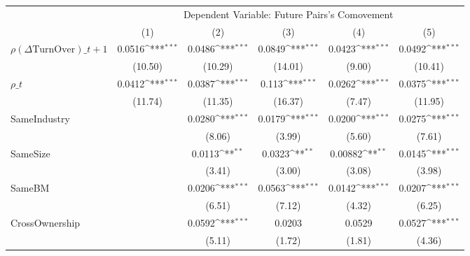 {
\def\sym#1{\ifmmode^{#1}\else\(^{#1}\)\fi}
\begin{tabular}{l*{5}{c}}
\hline\hline
                    &\multicolumn{5}{c}{Dependent Variable:  Future Pairs's Comovement}                                           \\\cmidrule(lr){2-6}
                    &\multicolumn{1}{c}{(1)}         &\multicolumn{1}{c}{(2)}         &\multicolumn{1}{c}{(3)}         &\multicolumn{1}{c}{(4)}         &\multicolumn{1}{c}{(5)}         \\
\hline
 $ {\rho(\Delta \text{TurnOver})\_{t+1}} $ &      0.0516\sym{***}&      0.0486\sym{***}&      0.0849\sym{***}&      0.0423\sym{***}&      0.0492\sym{***}\\
                    &     (10.50)         &     (10.29)         &     (14.01)         &      (9.00)         &     (10.41)         \\
[1em]
 $ {\rho\_t} $       &      0.0412\sym{***}&      0.0387\sym{***}&       0.113\sym{***}&      0.0262\sym{***}&      0.0375\sym{***}\\
                    &     (11.74)         &     (11.35)         &     (16.37)         &      (7.47)         &     (11.95)         \\
[1em]
SameIndustry        &                     &      0.0280\sym{***}&      0.0179\sym{***}&      0.0200\sym{***}&      0.0275\sym{***}\\
                    &                     &      (8.06)         &      (3.99)         &      (5.60)         &      (7.61)         \\
[1em]
SameSize            &                     &      0.0113\sym{**} &      0.0323\sym{**} &     0.00882\sym{**} &      0.0145\sym{***}\\
                    &                     &      (3.41)         &      (3.00)         &      (3.08)         &      (3.98)         \\
[1em]
SameBM              &                     &      0.0206\sym{***}&      0.0563\sym{***}&      0.0142\sym{***}&      0.0207\sym{***}\\
                    &                     &      (6.51)         &      (7.12)         &      (4.32)         &      (6.25)         \\
[1em]
CrossOwnership      &                     &      0.0592\sym{***}&      0.0203         &      0.0529         &      0.0527\sym{***}\\
                    &                     &      (5.11)         &      (1.72)         &      (1.81)         &      (4.36)         \\

\end{tabular}}
